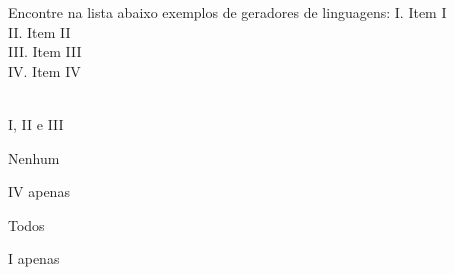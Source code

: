 \question[10]
Encontre na lista abaixo exemplos de geradores de linguagens:
I. Item I\\
II. Item II\\
III. Item III\\
IV. Item IV\\
\\
\begin{choices}
\item I, II e III
\item Nenhum
\item IV apenas
\item Todos
\item I apenas %
\end{choices}
\answerline

